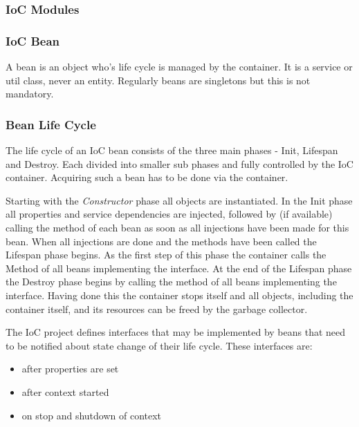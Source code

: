 \subsubsection{IoC Modules}
\TODO
\subsubsection{IoC Bean}
A bean is an object who's life cycle is managed by the container. It is a service or util class, never an entity. Regularly beans are singletons but this is not mandatory.

\subsubsection{Bean Life Cycle}

The life cycle of an IoC bean consists of the three main phases - Init, Lifespan and Destroy. Each divided into smaller sub phases and fully controlled by the \AMBETH{} IoC container. Acquiring such a bean has to be done via the container.

Starting with the \textit{Constructor} phase all objects are instantiated. In the Init phase all properties and service dependencies are injected, followed by (if available) calling the  method of each bean as soon as all injections have been made for this bean.
When all injections are done and the  methods have been called the Lifespan phase begins. As the first step of this phase the container calls the  Method of all beans implementing the  interface.
At the end of the Lifespan phase the Destroy phase begins by calling the  method of all beans implementing the  interface. Having done this the container stops itself and all objects, including the container itself, and its resources can be freed by the garbage collector.

\def\showimgref{img/bean-lifecycle.png}

The \AMBETH{} IoC project defines interfaces that may be implemented by beans that need to be notified about state change of their life cycle. These interfaces are:

\begin{itemize}
	\item {} after properties are set
	\item {} after context started
	\item {} on stop and shutdown of context
\end{itemize}

